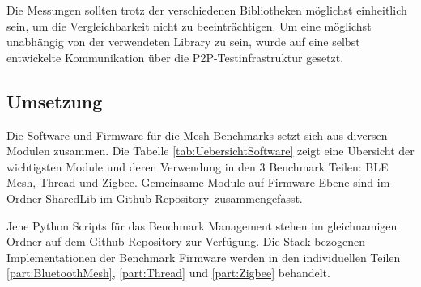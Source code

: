 Die Messungen sollten trotz der verschiedenen Bibliotheken möglichst einheitlich sein, um die Vergleichbarkeit nicht zu beeinträchtigen. Um eine möglichst unabhängig von der verwendeten Library zu sein, wurde auf eine selbst entwickelte Kommunikation über die P2P-Testinfrastruktur gesetzt. 


\subsection{Umsetzung}\label{subsec:Software_Umsetzung}


Die Software und Firmware für die Mesh Benchmarks setzt sich aus diversen Modulen zusammen. Die Tabelle \ref{tab:UebersichtSoftware} zeigt eine Übersicht der wichtigsten Module und deren Verwendung in den 3 Benchmark Teilen: BLE Mesh, Thread und Zigbee.
Gemeinsame Module auf Firmware Ebene sind im Ordner SharedLib im Github Repository\footnotemark\ zusammengefasst.

Jene Python Scripts für das Benchmark Management stehen im gleichnamigen Ordner auf dem Github Repository zur Verfügung.
Die Stack bezogenen Implementationen der Benchmark Firmware werden in den individuellen Teilen \ref{part:BluetoothMesh}, \ref{part:Thread} und \ref{part:Zigbee} behandelt.



